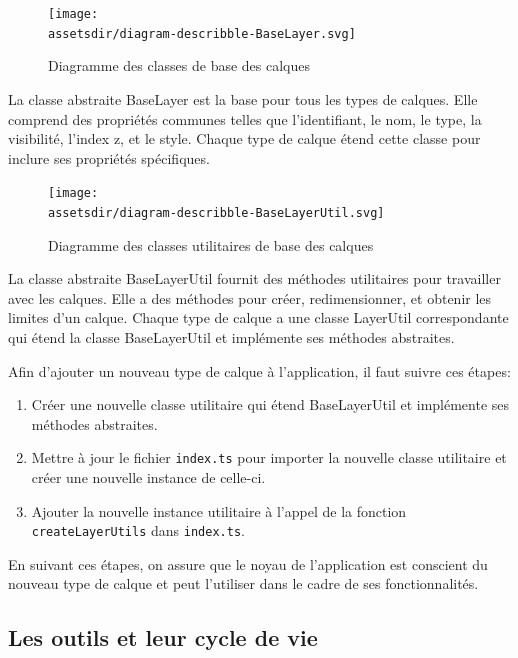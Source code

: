 \begin{figure}[h]
    \centering
    \texttt{[image: \\assetsdir/diagram-describble-BaseLayer.svg]}
    \caption{Diagramme des classes de base des calques}
    \label{fig:baseLayerDiagram}
\end{figure}

La classe abstraite BaseLayer est la base pour tous les types de calques. Elle comprend des propriétés communes telles que l'identifiant, le nom, le type, la visibilité, l'index z, et le style. Chaque type de calque étend cette classe pour inclure ses propriétés spécifiques.

\begin{figure}[h]
    \centering
    \texttt{[image: \\assetsdir/diagram-describble-BaseLayerUtil.svg]}
    \caption{Diagramme des classes utilitaires de base des calques}
    \label{fig:baseLayerUtilDiagram}
\end{figure}

La classe abstraite BaseLayerUtil fournit des méthodes utilitaires pour travailler avec les calques. Elle a des méthodes pour créer, redimensionner, et obtenir les limites d'un calque. Chaque type de calque a une classe LayerUtil correspondante qui étend la classe BaseLayerUtil et implémente ses méthodes abstraites.

Afin d'ajouter un nouveau type de calque à l'application, il faut suivre ces étapes:

\begin{enumerate}
    \item Créer une nouvelle classe utilitaire qui étend BaseLayerUtil et implémente ses méthodes abstraites.
    \item Mettre à jour le fichier \texttt{index.ts} pour importer la nouvelle classe utilitaire et créer une nouvelle instance de celle-ci.
    \item Ajouter la nouvelle instance utilitaire à l'appel de la fonction \texttt{createLayerUtils} dans \texttt{index.ts}.
\end{enumerate}

En suivant ces étapes, on assure que le noyau de l'application est conscient du nouveau type de calque et peut l'utiliser dans le cadre de ses fonctionnalités.

\subsection{Les outils et leur cycle de vie}

